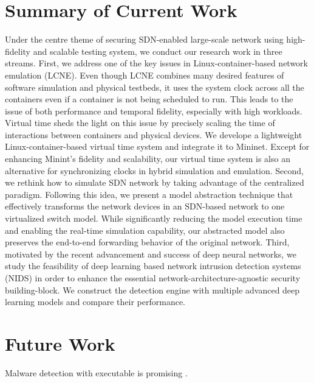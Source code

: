\label{Sec:Conclusion}

\section{Summary of Current Work}

Under the centre theme of securing SDN-enabled large-scale network using high-fidelity and scalable testing system, we conduct our research work in three streams.
First, we address one of the key issues in Linux-container-based network emulation (LCNE).
Even though LCNE combines many desired features of software simulation and physical testbeds,
it uses the system clock across all the containers even if a container is not being scheduled to run.
This leads to the issue of both performance and temporal fidelity, especially with high workloads.
Virtual time sheds the light on this issue by precisely scaling the time of interactions between containers and physical devices.
We develope a lightweight Linux-container-based virtual time system and integrate it to Mininet.
Except for enhancing Minint's fidelity and scalability,
our virtual time system is also an alternative for synchronizing clocks in hybrid simulation and emulation.
Second, we rethink how to simulate SDN network by taking advantage of the centralized paradigm.
Following this idea, we present a model abstraction technique that effectively transforms
the network devices in an SDN-based network to one virtualized switch model.
While significantly reducing the model execution time and enabling the real-time simulation capability,
our abstracted model also preserves the end-to-end forwarding behavior of the original network.
Third, motivated by the recent advancement and success of deep neural networks,
we study the feasibility of deep learning based network intrusion detection systems (NIDS) in order to enhance the essential network-architecture-agnostic security building-block.
We construct the detection engine with multiple advanced deep learning models and compare their performance.

\section{Future Work}
Malware detection with executable is promising
\cite{GatedConvNet, ACFG4BugSearch, GraphEmbedSimDetection, MalConvNvidia}.

